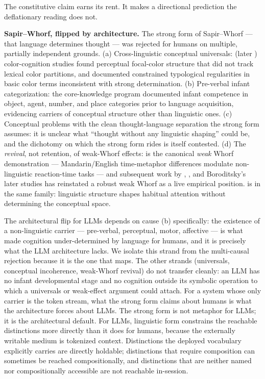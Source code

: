 \documentclass[11pt,a4paper]{article}
\begin{document}
The constitutive claim earns its rent. It makes a directional prediction the deflationary reading does not.

\textbf{Sapir--Whorf, flipped by architecture.} The strong form of Sapir--Whorf --- that language determines thought --- was rejected for humans on multiple, partially independent grounds. (a) Cross-linguistic conceptual universals: \citet{heider1972universals} (later \citealt{rosch1973natural}) color-cognition studies found perceptual focal-color structure that did not track lexical color partitions, and \citet{berlin1969basic} documented constrained typological regularities in basic color terms inconsistent with strong determination. (b) Pre-verbal infant categorization: the core-knowledge program \citep{spelke2000core,carey2009origin} documented infant competence in object, agent, number, and place categories prior to language acquisition, evidencing carriers of conceptual structure other than linguistic ones. (c) Conceptual problems with the clean thought-language separation the strong form assumes: it is unclear what ``thought without any linguistic shaping'' could be, and the dichotomy on which the strong form rides is itself contested. (d) The \textit{revival}, not retention, of weak-Whorf effects: \citet{boroditsky2001time} is the canonical \textit{weak} Whorf demonstration --- Mandarin/English time-metaphor differences modulate non-linguistic reaction-time tasks --- and subsequent work by \citet{lupyan2012linguistically}, \citet{casasanto2008time}, and Boroditsky's later studies has reinstated a robust weak Whorf as a live empirical position. \citet{levinson2003space} is in the same family: linguistic structure shapes habitual attention without determining the conceptual space.

The architectural flip for LLMs depends on cause (b) specifically: the existence of a non-linguistic carrier --- pre-verbal, perceptual, motor, affective --- is what made cognition under-determined by language for humans, and it is precisely what the LLM architecture lacks. We isolate this strand from the multi-causal rejection because it is the one that maps. The other strands (universals, conceptual incoherence, weak-Whorf revival) do not transfer cleanly: an LLM has no infant developmental stage and no cognition outside its symbolic operation to which a universals or weak-effect argument could attach. For a system whose only carrier is the token stream, what the strong form claims about humans is what the architecture forces about LLMs. The strong form is not metaphor for LLMs; it is the architectural default. For LLMs, linguistic form constrains the reachable distinctions more directly than it does for humans, because the externally writable medium is tokenized context. Distinctions the deployed vocabulary explicitly carries are directly holdable; distinctions that require composition can sometimes be reached compositionally, and distinctions that are neither named nor compositionally accessible are not reachable in-session.
\end{document}
